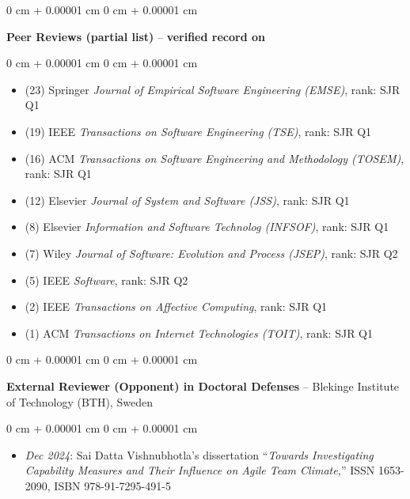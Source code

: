 \documentclass[10pt, a4paper]{article}
\newenvironment{highlights}{
    \begin{itemize}[
        topsep=0.10 cm,
        parsep=0.10 cm,
        partopsep=0pt,
        itemsep=0pt,
        leftmargin=0 cm + 10pt
    ]
}{
    \end{itemize}
} %
\newenvironment{onecolentry}{
    \begin{adjustwidth}{
        0 cm + 0.00001 cm
    }{
        0 cm + 0.00001 cm
    }
}{
    \end{adjustwidth}
} %
\let\hrefWithoutArrow\href
\renewcommand{\href}[2]{\hrefWithoutArrow{#1}{\ifthenelse{\equal{#2}{}}{ }{#2 }\raisebox{.15ex}{\footnotesize \faExternalLink*}}}
\begin{document}
        \vspace{0.2 cm}

        \begin{onecolentry}
            \textbf{Peer Reviews (partial list)} -- \textbf{verified record on \href{https://www.webofscience.com/wos/author/record/H-4177-2014}{Clarivate}}\end{onecolentry}

        \vspace{0.10 cm}
        \begin{onecolentry}
            \begin{highlights}
                \item (23) Springer \textit{Journal of Empirical Software Engineering (EMSE)}, rank: SJR Q1
                \item (19) IEEE \textit{Transactions on Software Engineering (TSE)}, rank: SJR Q1
                \item (16) ACM \textit{Transactions on Software Engineering and Methodology (TOSEM)}, rank: SJR Q1
                \item (12) Elsevier \textit{Journal of System and Software (JSS)}, rank: SJR Q1
                \item (8) Elsevier \textit{Information and Software Technolog (INFSOF)}, rank: SJR Q1
                \item (7) Wiley \textit{Journal of Software: Evolution and Process (JSEP)}, rank: SJR Q2
                \item (5) IEEE \textit{Software}, rank: SJR Q2
                \item (2) IEEE \textit{Transactions on Affective Computing}, rank: SJR Q1
                \item (1) ACM \textit{Transactions on Internet Technologies (TOIT)}, rank: SJR Q1
            \end{highlights}
        \end{onecolentry}


        \vspace{0.2 cm}

        \begin{onecolentry}
            \textbf{External Reviewer (Opponent) in Doctoral Defenses} -- Blekinge Institute of Technology (BTH), Sweden\end{onecolentry}

        \vspace{0.10 cm}
        \begin{onecolentry}
            \begin{highlights}
                \item \textit{Dec 2024}: Sai Datta Vishnubhotla's dissertation ``\textit{Towards Investigating Capability Measures and Their Influence on Agile Team Climate,}'' ISSN 1653-2090, ISBN 978-91-7295-491-5
            \end{highlights}
        \end{onecolentry}
\end{document}
